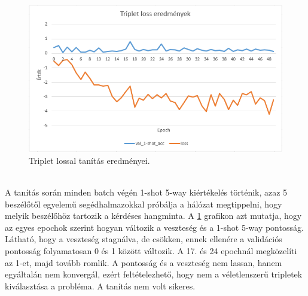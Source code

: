 \begin{figure}[!ht]
	\centering
	\includegraphics[width=150mm, keepaspectratio]{figures/triplet-loss-chart.png}
	\caption{Triplet lossal tanítás eredményei.}
	\label{fig:triplet-loss-chart}
\end{figure}
\ \\
A tanítás során minden batch végén 1-shot 5-way kiértékelés történik, azaz 5 beszélőtől egyelemű segédhalmazokkal próbálja a hálózat megtippelni, hogy melyik beszélőhöz tartozik a kérdéses hangminta.
\newline
\newline
A \ref{fig:triplet-loss-chart} grafikon azt mutatja, hogy az egyes epochok szerint hogyan változik a veszteség és a 1-shot 5-way pontosság. Látható, hogy a veszteség stagnálva, de csökken, ennek ellenére a validációs pontosság folyamatosan 0 és 1 között változik. A 17. és 24 epochnál megközelíti az 1-et, majd tovább romlik. A pontosság és a veszteség nem lassan, hanem egyáltalán nem konvergál, ezért feltételezhető, hogy nem a véletlenszerű tripletek kiválasztása a probléma. A tanítás nem volt sikeres.